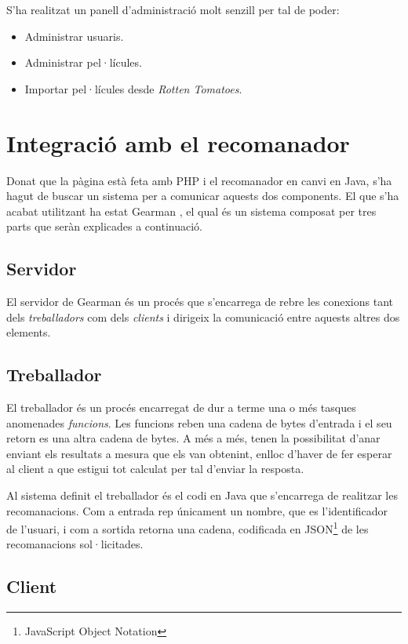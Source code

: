 S'ha realitzat un panell d'administració molt senzill per tal de poder:

\begin{itemize}
	\item Administrar usuaris.
	\item Administrar pel·lícules.
	\item Importar pel·lícules desde \emph{Rotten Tomatoes}.
\end{itemize}

\section{Integració amb el recomanador}

Donat que la pàgina està feta amb PHP i el recomanador en canvi en Java, s'ha hagut de buscar un sistema per a comunicar aquests dos components. El que s'ha acabat utilitzant ha estat Gearman \cite{gearman-web}, el qual és un sistema composat per tres parts que seràn explicades a continuació.

\subsection{Servidor}

El servidor de Gearman és un procés que s'encarrega de rebre les conexions tant dels \emph{treballadors} com dels \emph{clients} i dirigeix la comunicació entre aquests altres dos elements.

\subsection{Treballador}

El treballador és un procés encarregat de dur a terme una o més tasques anomenades \emph{funcions}. Les funcions reben una cadena de bytes d'entrada i el seu retorn es una altra cadena de bytes. A més a més, tenen la possibilitat d'anar enviant els resultats a mesura que els van obtenint, enlloc d'haver de fer esperar al client a que estigui tot calculat per tal d'enviar la resposta.

Al sistema definit el treballador és el codi en Java que s'encarrega de realitzar les recomanacions. Com a entrada rep únicament un nombre, que es l'identificador de l'usuari, i com a sortida retorna una cadena, codificada en JSON\footnote{JavaScript Object Notation} de les recomanacions sol·licitades.

\subsection{Client}

